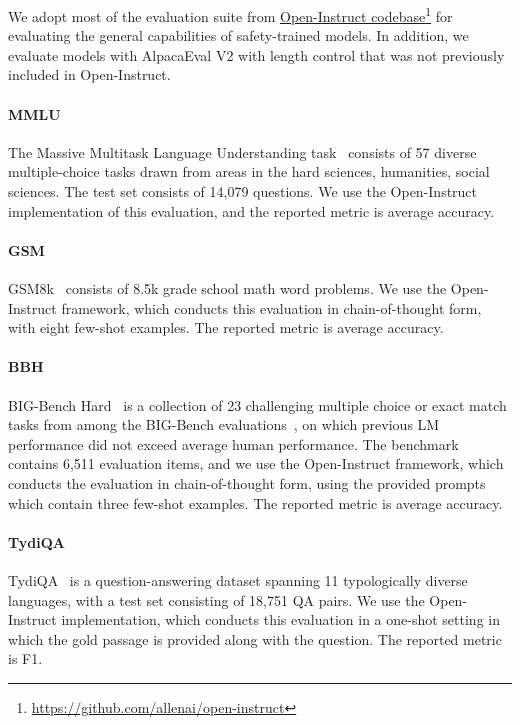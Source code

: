 We adopt most of the evaluation suite from \hyperlink{https://github.com/allenai/open-instruct}{Open-Instruct codebase}\footnote{\url{https://github.com/allenai/open-instruct}} \citep{wang2023far,ivison2023camels} for evaluating the general capabilities of safety-trained models. In addition, we evaluate models with AlpacaEval V2 with length control that was not previously included in Open-Instruct. 

\paragraph{MMLU} The Massive Multitask Language Understanding task~\citep{hendrycks2020measuring} consists of 57 diverse multiple-choice tasks drawn from areas in the hard sciences, humanities, social sciences. The test set consists of 14,079 questions. We use the Open-Instruct implementation of this evaluation, and the reported metric is average accuracy.


\paragraph{GSM} GSM8k~\citep{cobbe2021training} consists of 8.5k grade school math word problems. We use the Open-Instruct framework, which conducts this evaluation in chain-of-thought form, with eight few-shot examples. The reported metric is average accuracy.


\paragraph{BBH} BIG-Bench Hard~\citet{suzgun2023challenging} is a collection of 23 challenging multiple choice or exact match tasks from among the BIG-Bench evaluations~\citet{srivastava2023beyond}, on which previous LM performance did not exceed average human performance. The benchmark contains 6,511 evaluation items, and we use the Open-Instruct framework, which conducts the evaluation in chain-of-thought form, using the provided prompts which contain three few-shot examples. The reported metric is average accuracy.
 

\paragraph{TydiQA} TydiQA~\citep{clark2020tydi} is a question-answering dataset spanning 11 typologically diverse languages, with a test set consisting of 18,751 QA pairs. We use the Open-Instruct implementation, which conducts this evaluation in a one-shot setting in which the gold passage is provided along with the question. The reported metric is F1.


